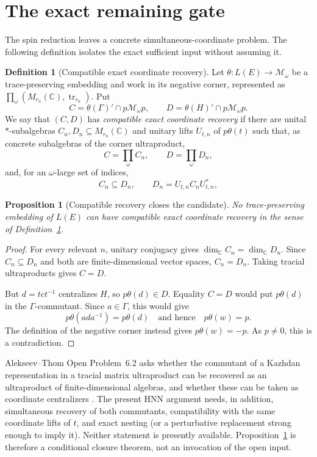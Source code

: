 \documentclass[11pt]{article}
\newtheorem{proposition}[theorem]{Proposition}
\theoremstyle{definition}
\newtheorem{definition}[theorem]{Definition}
\theoremstyle{remark}
\newcommand{\C}{\mathbb C}
\newcommand{\tr}{\operatorname{tr}}
\begin{document}
\section{The exact remaining gate}

The spin reduction leaves a concrete simultaneous-coordinate problem.  The
following definition isolates the exact sufficient input without assuming
it.

\begin{definition}[Compatible exact coordinate recovery]
\label{def:recovery}
Let $\theta:L(E)\to\mathcal M_\omega$ be a trace-preserving embedding and
work in its negative corner, represented as
$\prod_\omega(M_{r_n}(\C),\tr_{r_n})$.  Put
\[
 C=\theta(\Gamma)'\cap p\mathcal M_\omega p,
 \qquad
 D=\theta(H)'\cap p\mathcal M_\omega p.
\]
We say that $(C,D)$ has \emph{compatible exact coordinate recovery} if
there are unital $*$-subalgebras $C_n,D_n\subseteq M_{r_n}(\C)$ and unitary
lifts $U_{t,n}$ of $p\theta(t)$ such that, as concrete subalgebras of the
corner ultraproduct,
\[
 C=\prod_\omega C_n,
 \qquad D=\prod_\omega D_n,
\]
and, for an $\omega$-large set of indices,
\[
 C_n\subseteq D_n,
 \qquad D_n=U_{t,n}C_nU_{t,n}^*,
\]
\end{definition}

\begin{proposition}[Compatible recovery closes the candidate]
\label{prop:recoverycloses}
No trace-preserving embedding of $L(E)$ can have compatible exact coordinate
recovery in the sense of Definition~\ref{def:recovery}.
\end{proposition}

\begin{proof}
For every relevant $n$, unitary conjugacy gives
$\dim_\C C_n=\dim_\C D_n$.  Since $C_n\subseteq D_n$ and both are
finite-dimensional vector spaces, $C_n=D_n$.  Taking tracial ultraproducts
gives $C=D$.

But $d=tct^{-1}$ centralizes $H$, so $p\theta(d)\in D$.  Equality $C=D$
would put $p\theta(d)$ in the $\Gamma$-commutant.  Since $a\in\Gamma$, this
would give
\[
 p\theta(ada^{-1})=p\theta(d)
 \quad\text{and hence}\quad
 p\theta(w)=p.
\]
The definition of the negative corner instead gives $p\theta(w)=-p$.
As $p\ne0$, this is a contradiction.
\end{proof}

Alekseev--Thom Open Problem~6.2 asks whether the commutant of a Kazhdan
representation in a tracial matrix ultraproduct can be recovered as an
ultraproduct of finite-dimensional algebras, and whether these can be taken
as coordinate centralizers \cite{AlekseevThom}.  The present HNN argument
needs, in addition, simultaneous recovery of both commutants, compatibility
with the same coordinate lifts of $t$, and exact nesting (or a perturbative
replacement strong enough to imply it).  Neither statement is presently
available.  Proposition~\ref{prop:recoverycloses} is therefore a conditional
closure theorem, not an invocation of the open input.
\end{document}
